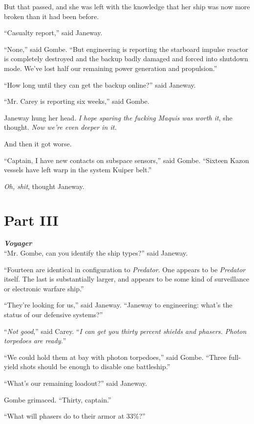 \documentclass[twoside,letterpaper,12pt]{memoir}
\begin{document}
But that passed, and she was left with the knowledge that her ship was now more broken than it had been before.

``Casualty report,'' said Janeway.

``None,'' said Gombe. ``But engineering is reporting the starboard impulse reactor is completely destroyed and the backup badly damaged and forced into shutdown mode. We've lost half our remaining power generation and propulsion.''

``How long until they can get the backup online?'' said Janeway.

``Mr. Carey is reporting six weeks,'' said Gombe.

Janeway hung her head. \textit{I hope sparing the fucking Maquis was worth it}, she thought. \textit{Now we're even deeper in it.}

And then it got worse.

``Captain, I have new contacts on subspace sensors,'' said Gombe. ``Sixteen Kazon vessels have left warp in the system Kuiper belt.''

\textit{Oh, shit}, thought Janeway.

\chapter*{Part III}

\textit{\textbf{Voyager}}\\

``Mr. Gombe, can you identify the ship types?'' said Janeway.

``Fourteen are identical in configuration to \textit{Predator}. One appears to be \textit{Predator} itself. The last is substantially larger, and appears to be some kind of surveillance or electronic warfare ship.''

``They're looking for us,'' said Janeway. ``Janeway to engineering: what's the status of our defensive systems?''

``\textit{Not good},'' said Carey. ``\textit{I can get you thirty percent shields and phasers. Photon torpedoes are ready.}''

``We could hold them at bay with photon torpedoes,'' said Gombe. ``Three full-yield shots should be enough to disable one battleship.''

``What's our remaining loadout?'' said Janeway.

Gombe grimaced. ``Thirty, captain.''

``What will phasers do to their armor at 33\%?''
\end{document}
